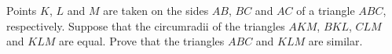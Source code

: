 \problem
Points $K$, $L$ and $M$ are taken on the sides $AB$, $BC$ and $AC$ of a
triangle $ABC$, respectively.
Suppose that the circumradii of the triangles $AKM$, $BKL$, $CLM$ and $KLM$ are
equal.
Prove that the triangles $ABC$ and $KLM$ are similar.
\solution
\endproblem
